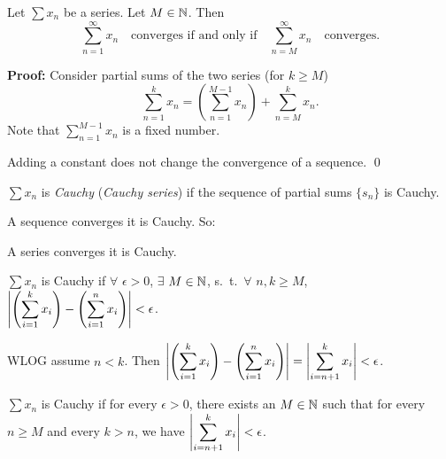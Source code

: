 \documentclass[10pt,aspectratio=149]{beamer}
\begin{document}
\begin{frame}

\begin{proposition}
Let $\sum x_n$ be a series.  Let $M \in {\mathbb{N}}$.  Then
\begin{equation*}
\sum_{n=1}^\infty x_n \quad \text{converges if and only if} \quad
\sum_{n=M}^\infty x_n \quad \text{converges.}
\end{equation*}
\end{proposition}

\pause
\textbf{Proof:}
Consider partial sums of the two series (for $k \geq M$)
\begin{equation*}
\sum_{n=1}^{k} x_n
=
\left(
\sum_{n=1}^{M-1} x_n
\right)
+
\sum_{n=M}^{k} x_n .
\end{equation*}
\pause
Note that 
$\sum_{n=1}^{M-1} x_n$ is a fixed number.

\pause
\medskip

Adding a constant does not change the convergence of a sequence.
\qed

\end{frame}

\begin{frame}

\begin{definition}
$\sum x_n$ is \emph{Cauchy} (\emph{Cauchy series})
if the sequence of partial sums $\{ s_n \}$ is Cauchy.
\end{definition}

\pause
A sequence converges \wiffif it is Cauchy.
\pause \qquad So:

A series converges \wiffif it is Cauchy.

\pause
\medskip

$\sum x_n$ is Cauchy if $\forall$ $\epsilon > 0$, $\exists$
$M \in {\mathbb{N}}$, s.\ t.\ $\forall$ $n,k \geq M$, ~
$\displaystyle
\left\lvert { \left( \sum\limits_{i=1}^k x_i \right) - \left( \sum\limits_{i=1}^n x_i \right) } \right\rvert
< \epsilon$.

\pause
\medskip

WLOG assume $n < k$.  Then
\quad
$\displaystyle
\left\lvert { \left( \sum_{i=1}^k x_i \right) - \left( \sum_{i=1}^n x_i \right) } \right\rvert
=
\left\lvert { \sum_{i={n+1}}^k x_i } \right\rvert
< \epsilon$.

\pause
\thus

\begin{proposition}
$\sum x_n$ is Cauchy if for every $\epsilon > 0$, 
there exists an $M \in {\mathbb{N}}$ such that for every $n \geq M$
and every $k > n$, we have
\quad
$\displaystyle \left\lvert { \sum_{i={n+1}}^k x_i } \right\rvert < \epsilon$.
\end{proposition}

\end{frame}
\end{document}
